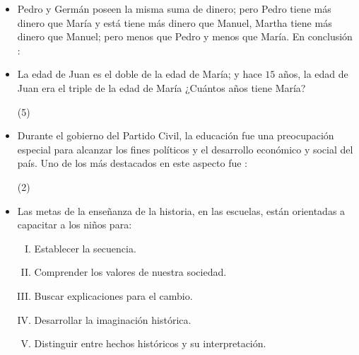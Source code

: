 \documentclass[10pt, twocolumn, landscape, a4paper]{article}
\begin{document}
\begin{itemize}
{\begin{tasks}
\end{tasks}}
\item{Pedro y Germán poseen la misma suma de dinero; pero Pedro tiene más dinero que María y está tiene más dinero que Manuel, Martha tiene más dinero que Manuel; pero menos que Pedro y menos que María. En conclusión :
\begin{tasks}
\end{tasks}}
\item{La edad de Juan es el doble de la edad de María; y hace $15$ años, la edad de Juan era el triple de la edad de María ¿Cuántos años tiene María?
\begin{tasks}(5)
\end{tasks}}
\item{Durante el gobierno del Partido Civil, la educación fue una preocupación especial para alcanzar los fines políticos y el desarrollo económico y social del país. Uno de los más destacados en este aspecto fue :
\begin{tasks}(2)
\end{tasks}}
\item{Las metas de la enseñanza de la historia, en las escuelas, están orientadas a capacitar a los niños para:
\begin{enumerate}[I. ]
\item{Establecer la secuencia.}
\item{Comprender los valores de nuestra sociedad.}
\item{Buscar explicaciones para el cambio.}
\item{Desarrollar la imaginación histórica.}
\item{Distinguir entre hechos históricos y su interpretación.}
\end{enumerate}

\begin{tasks}
\end{tasks}}
\end{itemize}
\end{document}
